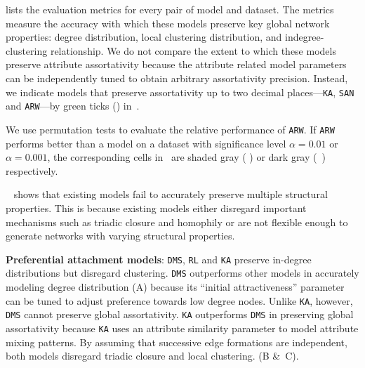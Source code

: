  lists the evaluation metrics for every pair of model
and dataset. The metrics measure the accuracy with which these models
preserve key global network properties: degree distribution, local clustering distribution,
and indegree-clustering relationship. We do not compare the extent to which these models preserve attribute assortativity because the attribute related model parameters can be independently tuned to obtain arbitrary assortativity precision. Instead, we indicate models that preserve assortativity up to two decimal
places---\texttt{KA}, \texttt{SAN} and \texttt{ARW}---by green ticks (\checkmark) in~.

We use permutation tests \cite{good2013permutation} to evaluate the relative
performance of \texttt{ARW}. If
\texttt{ARW} performs better than a model on a dataset with significance level
$\alpha=0.01$ or $\alpha=0.001$, the corresponding cells in~
are shaded gray ( \lightgraybg{ }) or dark gray (~\darkgraybg{ }) respectively.


~ shows that existing models fail to accurately preserve
{multiple} structural properties. This is because existing models either
disregard important mechanisms such as triadic closure and homophily or are not
flexible enough to generate networks with varying structural properties.


\textbf{Preferential attachment models}: \texttt{DMS}, \texttt{RL}
and \texttt{KA} preserve in-degree distributions but disregard
clustering. \texttt{DMS} outperforms other models in accurately modeling
degree distribution (A) because its ``initial attractiveness''
parameter can be tuned to adjust preference towards low degree nodes. Unlike \texttt{KA}, however,
\texttt{DMS} cannot preserve global assortativity.
\texttt{KA} outperforms \texttt{DMS} in preserving global assortativity because \texttt{KA}
uses an attribute similarity parameter to model attribute mixing patterns.
By assuming that successive edge formations are independent, both models disregard
triadic closure and local clustering. (B \&~C).

